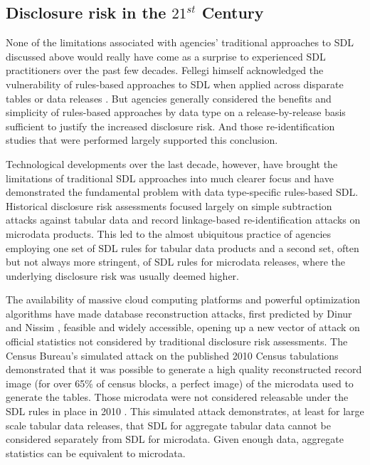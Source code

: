 \subsection{Disclosure risk in the $21^{st}$ Century}
None of the limitations associated with agencies' traditional approaches to SDL discussed above would really have come as a surprise to experienced SDL practitioners over the past few decades. Fellegi himself acknowledged the vulnerability of rules-based approaches to SDL when applied across disparate tables or data releases \cite{fellegi:1972:doi:10.1080/01621459.1972.10481199}. But agencies generally considered the benefits and simplicity of rules-based approaches by data type on a release-by-release basis sufficient to justify the increased disclosure risk. And those re-identification studies that were performed largely supported this conclusion. 

Technological developments over the last decade, however, have brought the limitations of traditional SDL approaches into much clearer focus and have demonstrated the fundamental problem with data type-specific rules-based SDL. Historical disclosure risk assessments focused largely on simple subtraction attacks against tabular data and record linkage-based re-identification attacks on microdata products. This led to the almost ubiquitous practice of agencies employing one set of SDL rules for tabular data products and a second set, often but not always more stringent, of SDL rules for microdata releases, where the underlying disclosure risk was usually deemed higher.

The availability of massive cloud computing platforms and powerful optimization algorithms have made database reconstruction attacks, first predicted by Dinur and Nissim \cite{dinur:nissim:2003:10.1145/773153.773173}, feasible and widely accessible, opening up a new vector of attack on official statistics not considered by traditional disclosure risk assessments. The Census Bureau's simulated attack on the published 2010 Census tabulations demonstrated that it was possible to generate a high quality reconstructed record image (for over 65\% of census blocks, a perfect image) of the microdata used to generate the tables. Those microdata were not considered releasable under the SDL rules in place in 2010 \cite{abowd:hawes:2023}. This simulated attack demonstrates, at least for large scale tabular data releases, that SDL for aggregate tabular data cannot be considered separately from SDL for microdata. Given enough data, aggregate statistics can be equivalent to microdata.

